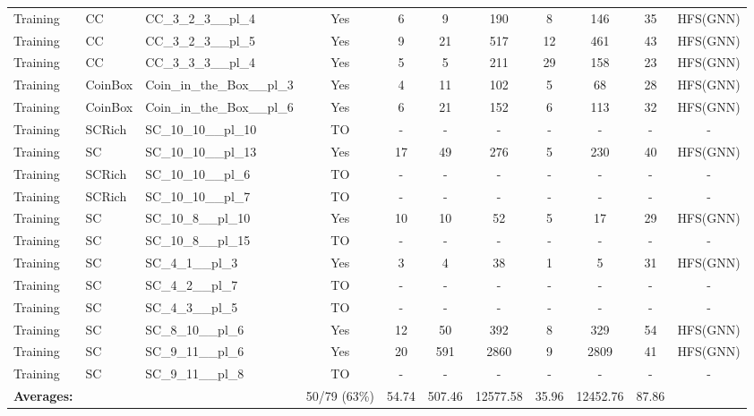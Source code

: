 \documentclass{article}
\begin{document}
\begin{tabular}{lllcccccccc}
Training & CC & CC\_3\_2\_3\_\_pl\_4 & Yes & 6 & 9 & 190 & 8 & 146 & 35 & HFS(GNN) \\
Training & CC & CC\_3\_2\_3\_\_pl\_5 & Yes & 9 & 21 & 517 & 12 & 461 & 43 & HFS(GNN) \\
Training & CC & CC\_3\_3\_3\_\_pl\_4 & Yes & 5 & 5 & 211 & 29 & 158 & 23 & HFS(GNN) \\
Training & CoinBox & Coin\_in\_the\_Box\_\_pl\_3 & Yes & 4 & 11 & 102 & 5 & 68 & 28 & HFS(GNN) \\
Training & CoinBox & Coin\_in\_the\_Box\_\_pl\_6 & Yes & 6 & 21 & 152 & 6 & 113 & 32 & HFS(GNN) \\
Training & SCRich & SC\_10\_10\_\_pl\_10 & TO & - & - & - & - & - & - & - \\
Training & SC & SC\_10\_10\_\_pl\_13 & Yes & 17 & 49 & 276 & 5 & 230 & 40 & HFS(GNN) \\
Training & SCRich & SC\_10\_10\_\_pl\_6 & TO & - & - & - & - & - & - & - \\
Training & SCRich & SC\_10\_10\_\_pl\_7 & TO & - & - & - & - & - & - & - \\
Training & SC & SC\_10\_8\_\_pl\_10 & Yes & 10 & 10 & 52 & 5 & 17 & 29 & HFS(GNN) \\
Training & SC & SC\_10\_8\_\_pl\_15 & TO & - & - & - & - & - & - & - \\
Training & SC & SC\_4\_1\_\_pl\_3 & Yes & 3 & 4 & 38 & 1 & 5 & 31 & HFS(GNN) \\
Training & SC & SC\_4\_2\_\_pl\_7 & TO & - & - & - & - & - & - & - \\
Training & SC & SC\_4\_3\_\_pl\_5 & TO & - & - & - & - & - & - & - \\
Training & SC & SC\_8\_10\_\_pl\_6 & Yes & 12 & 50 & 392 & 8 & 329 & 54 & HFS(GNN) \\
Training & SC & SC\_9\_11\_\_pl\_6 & Yes & 20 & 591 & 2860 & 9 & 2809 & 41 & HFS(GNN) \\
Training & SC & SC\_9\_11\_\_pl\_8 & TO & - & - & - & - & - & - & - \\
\textbf{Averages:} & & & 50/79 (63\%) & 54.74 & 507.46 & 12577.58 & 35.96 & 12452.76 & 87.86 & \\
\bottomrule
\end{tabular}
\newpage
\end{document}
